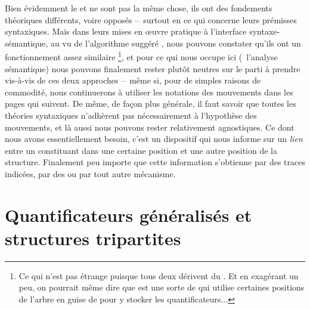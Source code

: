 
Bien évidemment le  et  ne sont pas la même chose, ils ont des fondements théoriques différents, voire opposés --~surtout en ce qui concerne leurs prémisses syntaxiques. 
Mais dans leurs mises en \oe uvre pratique à l'interface syntaxe-sémantique, au vu de l'algorithme suggéré , nous pouvons constater qu'ils ont un fonctionnement assez similaire%
\footnote{Ce qui n'est pas étrange puisque tous deux dérivent du . Et en exagérant un peu, on pourrait même dire que  est une sorte de  qui utilise certaines positions de l'arbre en guise de  pour y stocker les quantificateurs...}, et pour ce qui nous occupe ici (\ie\ l'analyse sémantique) nous pouvons finalement rester plutôt neutres sur le parti à prendre vis-à-vis de ces deux approches --~même si, pour de simples raisons de commodité, nous continuerons à utiliser les notations des mouvements dans les pages qui suivent.
De même, de façon plus générale, il faut savoir que toutes les théories syntaxiques n'adhèrent pas nécessairement à l'hypothèse des mouvements, et là aussi nous pouvons rester relativement agnostiques.  Ce dont nous avons essentiellement besoin, c'est un dispositif qui nous informe sur un \emph{lien} entre un constituant dans une certaine position et une autre position de la structure.  Finalement peu importe que cette information s'obtienne par des  traces indicées, par des  ou par tout autre mécanisme.




\section{Quantificateurs généralisés et structures tripartites}
\label{s:QG}


